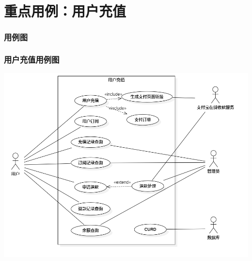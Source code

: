 \section{重点用例：用户充值}
\begin{frame}
    \frametitle{用例图}
    \frametitle{用户充值用例图}
    \center
    \includegraphics[scale=0.3]{contents/figure/recharge_usecase_diagram.png}
\end{frame}